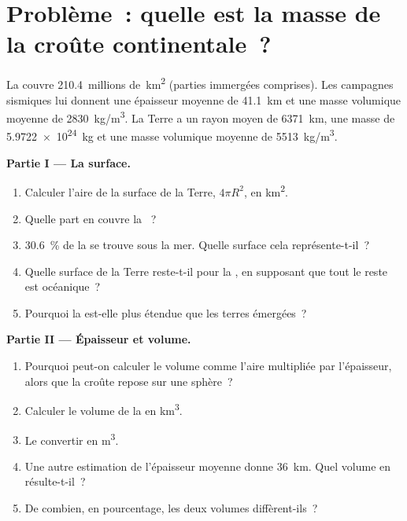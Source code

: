 \section{Problème~: quelle est la masse de la croûte continentale~?}

\begin{problem}
\label{pb:g12:continental-crust:1}
La  couvre \num{210.4}~millions de~\unit{km^2} (parties
immergées comprises). Les campagnes sismiques lui donnent une épaisseur
moyenne de \qty{41.1}{km} et une masse volumique moyenne de
\qty{2830}{kg/m^3}. La Terre a un rayon moyen de \qty{6371}{km}, une masse
de \qty{5.9722e24}{kg} et une masse volumique moyenne de
\qty{5513}{kg/m^3}.

\medskip
\noindent\textbf{Partie I --- La surface.}
\begin{enumerate}
  \item Calculer l'aire de la surface de la Terre, $4\pi R^2$, en
        \unit{km^2}.
  \item Quelle part en couvre la ~?
  \item \qty{30.6}{\percent} de la  se trouve sous la
        mer. Quelle surface cela représente-t-il~?
  \item Quelle surface de la Terre reste-t-il pour la , en
        supposant que tout le reste est océanique~?
  \item Pourquoi la  est-elle plus étendue que les terres
        émergées~?
\end{enumerate}

\medskip
\noindent\textbf{Partie II --- Épaisseur et volume.}
\begin{enumerate}[resume]
  \item Pourquoi peut-on calculer le volume comme l'aire multipliée par
        l'épaisseur, alors que la croûte repose sur une sphère~?
  \item Calculer le volume de la  en \unit{km^3}.
  \item Le convertir en \unit{m^3}.
  \item Une autre estimation de l'épaisseur moyenne donne \qty{36}{km}.
        Quel volume en résulte-t-il~?
  \item De combien, en pourcentage, les deux volumes diffèrent-ils~?
\end{enumerate}


\end{problem}
